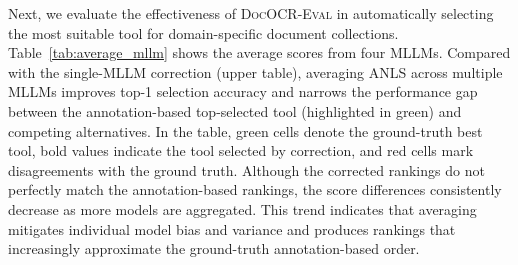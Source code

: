 \documentclass[11pt]{article}
\newcommand{\projectname}{\textsc{DocOCR-Eval}\xspace}
\begin{document}
Next, we evaluate the effectiveness of \projectname in automatically selecting the most suitable tool for domain-specific document collections. Table~\ref{tab:average_mllm} shows the average scores from four MLLMs. Compared with the single-MLLM correction (upper table), averaging ANLS across multiple MLLMs improves top-1 selection accuracy and narrows the performance gap between the annotation-based top-selected tool (highlighted in green) and competing alternatives. In the table, green cells denote the ground-truth best tool, bold values indicate the tool selected by correction, and red cells mark disagreements with the ground truth. Although the corrected rankings do not perfectly match the annotation-based rankings, the score differences consistently decrease as more models are aggregated. This trend indicates that averaging mitigates individual model bias and variance and produces rankings that increasingly approximate the ground-truth annotation-based order.
%
\end{document}
